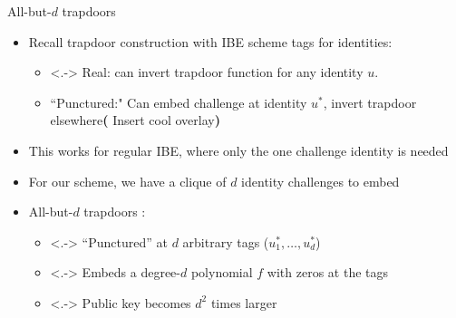 \documentclass{beamer}%
\newcommand{\jnote}[1]{{\bf (\color{red}{Jacob:}} {#1}{\bf ) }}
\newcommand{\jnote}[1]{}
\begin{document}
\begin{frame}{All-but-$d$ trapdoors}

  \begin{itemize}
  \item<+-> Recall  trapdoor construction with
     IBE scheme tags for identities:\\

    \begin{itemize}
    \item<.-> Real: can invert trapdoor function for any identity $u$.
    \item<+-> ``Punctured:" Can embed challenge at identity $u^*$, invert
      trapdoor elsewhere\jnote{Insert cool overlay}
    \end{itemize}
\item<+-> This works for regular IBE, where only the one challenge
  identity is needed
\item<+-> For our scheme, we have a clique of $d$ identity challenges
  to embed
  \item<+-> All-but-$d$ trapdoors :
    \begin{itemize}
    \item<.-> ``Punctured'' at $d$ arbitrary tags ($u_1^*,\ldots,
      u_d^*$)
    \item<.-> Embeds a degree-$d$ polynomial $f$ with zeros at the
      tags
    \item<.-> Public key becomes $d^2$ times larger
    \end{itemize}
  \end{itemize}
\end{frame}
\end{document}
